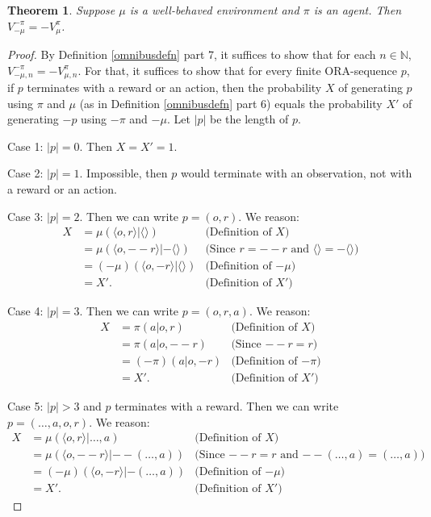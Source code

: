 \documentclass{article}
\newtheorem{theorem}{Theorem}
\begin{document}
\begin{theorem}
    Suppose $\mu$ is a well-behaved environment and $\pi$ is an agent.
    Then $V^{-\pi}_{-\mu}=-V^\pi_\mu$.
\end{theorem}

\begin{proof}
    By Definition \ref{omnibusdefn} part 7,
    it suffices to show that for each $n\in\mathbb N$,
    $V^{-\pi}_{-\mu,n}=-V^\pi_{\mu,n}$.
    For that, it suffices to show that for every finite ORA-sequence
    $p$, if $p$ terminates with a reward or an action, then
    the probability $X$ of generating $p$ using $\pi$ and $\mu$
    (as in Definition \ref{omnibusdefn} part 6)
    equals the probability $X'$ of generating $-p$
    using $-\pi$ and $-\mu$. Let $|p|$ be the length of $p$.

    Case 1: $|p|=0$. Then $X=X'=1$.

    Case 2: $|p|=1$. Impossible, then $p$ would terminate with an observation,
    not with a reward or an action.

    Case 3: $|p|=2$. Then we can write $p=(o,r)$.
    We reason:
    \begin{align*}
        X &= \mu(\langle o,r\rangle|\langle\rangle)
            &\mbox{(Definition of $X$)}\\
          &= \mu(\langle o,--r\rangle | {-\langle\rangle})
            &\mbox{(Since $r=--r$ and $\langle\rangle=-\langle\rangle$)}\\
          &= (-\mu)(\langle o,-r\rangle | {\langle\rangle})
            &\mbox{(Definition of $-\mu$)}\\
          &= X'. &\mbox{(Definition of $X'$)}
    \end{align*}

    Case 4: $|p|=3$. Then we can write $p=(o,r,a)$. We reason:
    \begin{align*}
        X &= \pi(a|o,r)
            &\mbox{(Definition of $X$)}\\
          &= \pi(a|o,--r)
            &\mbox{(Since $--r=r$)}\\
          &= (-\pi)(a|o,-r)
            &\mbox{(Definition of $-\pi$)}\\
          &= X'. &\mbox{(Definition of $X'$)}
    \end{align*}

    Case 5: $|p|>3$ and $p$ terminates with a reward.
    Then we can write $p=(\ldots,a,o,r)$. We reason:
    \begin{align*}
        X &= \mu(\langle o,r\rangle|\ldots, a)
            &\mbox{(Definition of $X$)}\\
          &= \mu(\langle o,--r\rangle | --(\ldots,a))
            &\mbox{(Since $--r=r$ and $--(\ldots,a)=(\ldots,a)$)}\\
          &= (-\mu)(\langle o,-r\rangle | -(\ldots,a))
            &\mbox{(Definition of $-\mu$)}\\
          &= X'. &\mbox{(Definition of $X'$)}
    \end{align*}


\end{proof}
\end{document}
